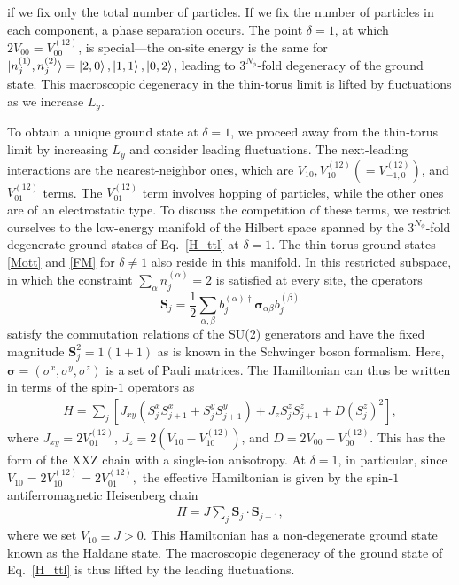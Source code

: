 \documentclass[aps,prb,twocolumn,superscriptaddress,showpacs,floatfix]{revtex4-1}
\begin{document}
if we fix only the total number of particles. 
If we fix the number of particles in each component, a phase separation occurs. 
The point $\delta=1$, at which $2V_{00}=V^{(12)}_{00}$, is special---the on-site energy is the same for $\ket{n^{(1)}_j,n^{(2)}_j}=\ket{2,0}, \ket{1,1}, \ket{0,2}$, leading to $3^{N_\phi}$-fold degeneracy of the ground state. 
This macroscopic degeneracy in the thin-torus limit is lifted by fluctuations as we increase $L_y$.

To obtain a unique ground state at $\delta=1$, we proceed away from the thin-torus limit by increasing $L_y$ and consider leading fluctuations. The next-leading interactions are the  nearest-neighbor ones, which are $V_{10}, V^{(12)}_{10} (=V^{(12)}_{-1,0})$, and $V^{(12)}_{01}$ terms. 
The $V^{(12)}_{01}$ term involves hopping of particles, while the other ones are of an electrostatic type. 
To discuss the competition of these terms, we restrict ourselves to the low-energy manifold of the Hilbert space spanned by the $3^{N_\phi}$-fold degenerate ground states of Eq.~\eqref{H_ttl} at $\delta=1$. 
The thin-torus ground states \eqref{Mott} and \eqref{FM} for $\delta\ne 1$ also reside in this manifold. 
In this restricted subspace, in which the constraint $\sum_\alpha n_j^{(\alpha)}=2$ is satisfied at every site, the operators
\begin{equation}
 \bm{S}_j = \frac12 \sum_{\alpha,\beta} b_j^{(\alpha)\dagger} \bm{\sigma}_{\alpha\beta} b_j^{(\beta)} 
\end{equation}
satisfy the commutation relations of the SU(2) generators and have the fixed magnitude $\bm{S}_j^2=1(1+1)$ as is known in the Schwinger boson formalism.\cite{Auerbach} 
Here, $\bm{\sigma}=(\sigma^x,\sigma^y,\sigma^z)$ is a set of Pauli matrices. 
The Hamiltonian can thus be written in terms of the spin-$1$ operators as 
\begin{align}
H=\sum_j \left[J_{xy}(S^x_jS^x_{j+1}+S^y_jS^y_{j+1})+J_zS^z_jS^z_{j+1}+D(S^z_j)^2 \right],\label{H_XXZ}
\end{align}
where $J_{xy}=2V^{(12)}_{01}$, $J_z=2(V_{10}-V^{(12)}_{10})$, and $D=2V_{00}-V^{(12)}_{00}$. This has the form of the XXZ chain with a single-ion anisotropy.\cite{denNijs,KennedyTasaki,ChenHidaSanctuary} At $\delta=1$, in particular, since $V_{10}=2V^{(12)}_{10}=2V^{(12)}_{01},$ the effective Hamiltonian is given by the spin-$1$ antiferromagnetic Heisenberg chain
\begin{align}
H=J\sum_j\bm{S}_j\cdot\bm{S}_{j+1},
\label{Heis}
\end{align}
where we set $V_{10}\equiv J>0$. 
This Hamiltonian has a non-degenerate ground state known as the Haldane state.\cite{HaldanePhysLett, Haldane, AKLT1, AKLT2} The macroscopic degeneracy of the ground state of Eq.\ \eqref{H_ttl} is thus lifted by the leading fluctuations.
\end{document}
